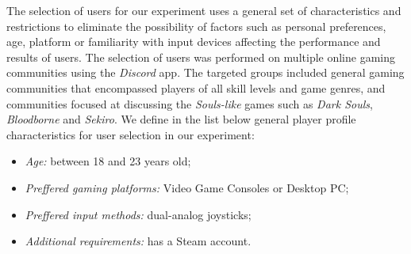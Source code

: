 The selection of users for our experiment uses a general set of characteristics and restrictions to eliminate the possibility of factors such as personal preferences, age, platform or familiarity with input devices affecting the performance and results of users. The selection of users was performed on multiple online gaming communities using the \emph{Discord} app. The targeted groups included general gaming communities that encompassed players of all skill levels and game genres, and communities focused at discussing the \emph{Souls-like} games such as \emph{Dark Souls}, \emph{Bloodborne} and \emph{Sekiro}. We define in the list below general player profile characteristics for user selection in our experiment:
\begin{itemize}
    \item{\emph{Age:} between 18 and 23 years old;}
    \item{\emph{Preffered gaming platforms:} Video Game Consoles or Desktop PC;}
    \item{\emph{Preffered input methods:} dual-analog joysticks;}
    \item{\emph{Additional requirements:} has a Steam account.}
\end{itemize}

